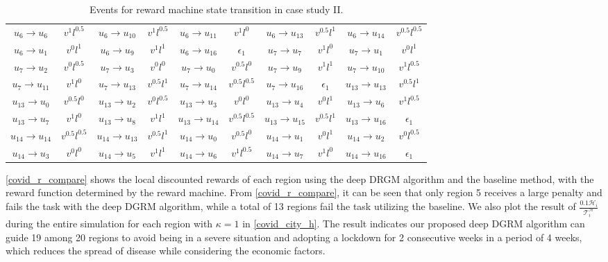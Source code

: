 \documentclass[conf]{new-aiaa}
\def\foo ABC{DGRM}
\begin{document}
\begin{table*}[]
\begin{tabular}{c|c|c|c|c|c|c|c|c|c}
         $u_6 \to u_6$ & $v^1l^{0.5}$ & $u_6 \to u_{10}$ & $ v^{1}l^{0.5}$ & $u_6 \to u_{11}$ & $v^1l^0$ & $u_6 \to u_{13}$ & $v^{0.5}l^1$ & $u_6 \to u_{14}$ & $v^{0.5}l^{0.5}$\\
         $u_6 \to u_1$ & $v^{0}l^{1}$ & $u_6 \to u_9$ & $v^{1}l^{1}$ & $u_6 \to u_{16}$ & $\epsilon_1$ & $u_7 \to u_7$ & $v^{1}l^{0}$ & $u_7 \to u_1$ & $v^{0}l^{1}$ \\
         $u_7 \to u_2$ & $v^{0}l^{0.5}$ & $u_7 \to u_3$ & $v^{0}l^{0}$ & $u_7 \to u_{0}$ & $v^{0.5}l^{0}$ & $u_7 \to u_9$ & $v^{1}l^{1}$ & $u_7 \to u_{10}$ & $v^{1}l^{0.5}$\\
         $u_7 \to u_{11}$ & $v^{1}l^{0}$ & $u_7 \to u_{13}$ & $v^{0.5}l^{1}$ & $u_7 \to u_{14}$ & $v^{0.5}l^{0.5}$ & $u_7 \to u_{16}$ & $\epsilon_1$ & $u_{13} \to u_{13}$ & $v^{0.5}l^{1}$\\
         $u_{13} \to u_{0}$ & $v^{0.5}l^{0}$ & $u_{13} \to u_{2}$ & $v^{0}l^{0.5}$ & $u_{13} \to u_{3}$ & $v^{0}l^{0}$ & $u_{13} \to u_{4}$ & $v^{0}l^{1}$ & $u_{13} \to u_{6}$ & $v^{1}l^{0.5}$\\
         $u_{13} \to u_{7}$ & $v^{1}l^{0}$ & $u_{13} \to u_{8}$ & $v^{1}l^{1}$ & $u_{13} \to u_{14}$ & $v^{0.5}l^{0.5}$ & $u_{13} \to u_{15}$ & $v^{0.5}l^{1}$ & $u_{13} \to u_{16}$ & $\epsilon_1$\\
         $u_{14} \to u_{14}$ & $v^{0.5}l^{0.5}$ & $u_{14} \to u_{13}$ & $v^{0.5}l^{1}$ & $u_{14} \to u_{0}$ & $v^{0.5}l^{0}$ & $u_{14} \to u_{1}$ & $v^{0}l^{1}$ & $u_{14} \to u_{2}$ & $v^{0}l^{0.5}$\\
         $u_{14} \to u_{3}$ & $v^{0}l^{0}$ & $u_{14} \to u_{5}$ & $v^{1}l^{1}$ & $u_{14} \to u_{6}$ & $v^{1}l^{0.5}$ & $u_{14} \to u_{7}$ & $v^{1}l^{0}$ & $u_{14} \to u_{16}$ & $\epsilon_1$\\
         
         
    \hline
    \end{tabular}
    \caption{Events for reward machine state transition in case study II.}
    \label{table:rm transition}
\end{table*}



\cref{covid_r_compare} shows the local discounted rewards of each region using the deep DRGM algorithm and the baseline method, with the reward function determined by the reward machine. From \cref{covid_r_compare}, it can be seen that only region 5 receives a large penalty and fails the task with the deep \foo ABC algorithm, while a total of 13 regions fail the task utilizing the baseline. We also plot the result of $\frac{0.1\mathcal{H}_i}{\mathcal{T}_i^\mathcal{H}}$ during the entire simulation for each region with $\kappa = 1$ in \cref{covid_city_h}. The result indicates our proposed deep \foo ABC algorithm can guide 19 among 20 regions to avoid being in a severe situation and adopting a lockdown for 2 consecutive weeks in a period of 4 weeks, which reduces the spread of disease while considering the economic factors.
\end{document}

